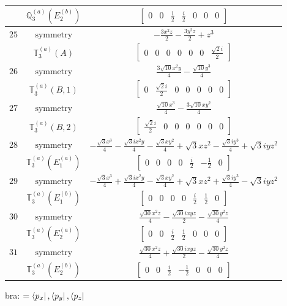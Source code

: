 \documentclass[fleqn,8pt,landscape]{jsarticle}
\begin{document}
\begin{longtable}{ccc}
$  $ & $ \mathbb{Q}_{3}^{(a)}(E_{2}^{(b)}) $ & $ \begin{bmatrix} 0 & 0 & \frac{1}{2} & \frac{i}{2} & 0 & 0 & 0 \end{bmatrix} $ \\ \hline
$ 25 $ & $ \text{symmetry} $ & $ - \frac{3 x^{2} z}{2} - \frac{3 y^{2} z}{2} + z^{3} $ \\
$  $ & $ \mathbb{T}_{3}^{(a)}(A) $ & $ \begin{bmatrix} 0 & 0 & 0 & 0 & 0 & 0 & \frac{\sqrt{2} i}{2} \end{bmatrix} $ \\ \hline
$ 26 $ & $ \text{symmetry} $ & $ \frac{3 \sqrt{10} x^{2} y}{4} - \frac{\sqrt{10} y^{3}}{4} $ \\
$  $ & $ \mathbb{T}_{3}^{(a)}(B,1) $ & $ \begin{bmatrix} 0 & \frac{\sqrt{2} i}{2} & 0 & 0 & 0 & 0 & 0 \end{bmatrix} $ \\ \hline
$ 27 $ & $ \text{symmetry} $ & $ \frac{\sqrt{10} x^{3}}{4} - \frac{3 \sqrt{10} x y^{2}}{4} $ \\
$  $ & $ \mathbb{T}_{3}^{(a)}(B,2) $ & $ \begin{bmatrix} \frac{\sqrt{2} i}{2} & 0 & 0 & 0 & 0 & 0 & 0 \end{bmatrix} $ \\ \hline
$ 28 $ & $ \text{symmetry} $ & $ - \frac{\sqrt{3} x^{3}}{4} - \frac{\sqrt{3} i x^{2} y}{4} - \frac{\sqrt{3} x y^{2}}{4} + \sqrt{3} x z^{2} - \frac{\sqrt{3} i y^{3}}{4} + \sqrt{3} i y z^{2} $ \\
$  $ & $ \mathbb{T}_{3}^{(a)}(E_{1}^{(a)}) $ & $ \begin{bmatrix} 0 & 0 & 0 & 0 & \frac{i}{2} & - \frac{1}{2} & 0 \end{bmatrix} $ \\ \hline
$ 29 $ & $ \text{symmetry} $ & $ - \frac{\sqrt{3} x^{3}}{4} + \frac{\sqrt{3} i x^{2} y}{4} - \frac{\sqrt{3} x y^{2}}{4} + \sqrt{3} x z^{2} + \frac{\sqrt{3} i y^{3}}{4} - \sqrt{3} i y z^{2} $ \\
$  $ & $ \mathbb{T}_{3}^{(a)}(E_{1}^{(b)}) $ & $ \begin{bmatrix} 0 & 0 & 0 & 0 & \frac{i}{2} & \frac{1}{2} & 0 \end{bmatrix} $ \\ \hline
$ 30 $ & $ \text{symmetry} $ & $ \frac{\sqrt{30} x^{2} z}{4} - \frac{\sqrt{30} i x y z}{2} - \frac{\sqrt{30} y^{2} z}{4} $ \\
$  $ & $ \mathbb{T}_{3}^{(a)}(E_{2}^{(a)}) $ & $ \begin{bmatrix} 0 & 0 & \frac{i}{2} & \frac{1}{2} & 0 & 0 & 0 \end{bmatrix} $ \\ \hline
$ 31 $ & $ \text{symmetry} $ & $ \frac{\sqrt{30} x^{2} z}{4} + \frac{\sqrt{30} i x y z}{2} - \frac{\sqrt{30} y^{2} z}{4} $ \\
$  $ & $ \mathbb{T}_{3}^{(a)}(E_{2}^{(b)}) $ & $ \begin{bmatrix} 0 & 0 & \frac{i}{2} & - \frac{1}{2} & 0 & 0 & 0 \end{bmatrix} $ \\ \hline
\end{longtable}
bra: $=\bra{p_{x}}, \bra{p_{y}}, \bra{p_{z}}$
\end{document}
